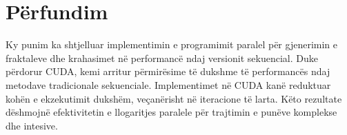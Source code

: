\chapter{Përfundim}

Ky punim ka shtjelluar implementimin e programimit paralel për gjenerimin e fraktaleve dhe krahasimet në performancë ndaj versionit sekuencial. Duke përdorur CUDA, kemi arritur përmirësime të dukshme të performancës ndaj metodave tradicionale sekuenciale.  Implementimet në CUDA kanë reduktuar kohën e ekzekutimit dukshëm, veçanërisht në iteracione të larta. Këto rezultate dëshmojnë efektivitetin e llogaritjes paralele për trajtimin e punëve komplekse dhe intesive.